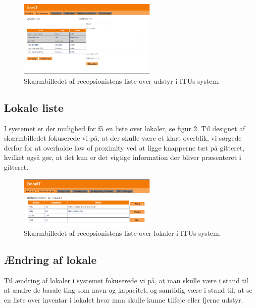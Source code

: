 \begin{figure}[h!]
  \centering
    \includegraphics[width=0.6\textwidth]{Appendix/GUI-Prototype/DigitalMockup/UdstyrsListe}
  \caption{Skærmbilledet af recepsionistens liste over udstyr i ITUs system.}
\label{Design_G_Development_UdstyrsListe_Final}
\end{figure} 

\subsection{Lokale liste}
I systemet er der mulighed for få en liste over lokaler, se figur \ref{Design_G_Development_LokaleListe_Final}. Til designet af skærmbilledet fokuserede vi på, at der skulle være et  klart overblik, vi sørgede derfor for at overholde law of proximity ved at ligge knapperne tæt på gitteret, hvilket også gør, at det kun er det vigtige information der bliver præsenteret i gitteret.

\begin{figure}[h!]
  \centering
    \includegraphics[width=0.6\textwidth]{Appendix/GUI-Prototype/DigitalMockup/LokaleListe}
  \caption{Skærmbilledet af recepsionistens liste over lokaler i ITUs system.}
\label{Design_G_Development_LokaleListe_Final}
\end{figure} 

\subsection{Ændring af lokale}
Til ændring af lokaler i systemet fokuserede vi på, at man skulle være i stand til at ændre de basale ting som navn og kapacitet, og samtidig være i stand til, at se en liste over inventar i lokalet hvor man skulle kunne tilføje eller fjerne udstyr.

